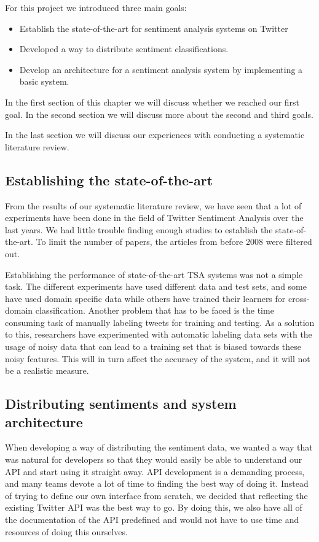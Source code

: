 
For this project we introduced three main goals:
\begin{itemize}
\item Establish the state-of-the-art for sentiment analysis systems on Twitter
\item Developed a way to distribute sentiment classifications.
\item Develop an architecture for a sentiment analysis system by implementing a basic system.
\end{itemize}

\noindent In the first section of this chapter we will discuss whether we reached our first goal. In the second section we will discuss more about the second and third goals. 

In the last section we will discuss our experiences with conducting a systematic literature review. 


\subsection{Establishing the state-of-the-art}
From the results of our systematic literature review, we have seen that a lot of experiments have been done in the field of Twitter Sentiment Analysis over the last years. We had little trouble finding enough studies to establish the state-of-the-art. To limit the number of papers, the articles from before 2008 were filtered out.

Establishing the performance of state-of-the-art TSA systems was not a simple task. The different experiments have used different data and test sets, and some have used domain specific data while others have trained their learners for cross-domain classification. Another problem that has to be faced is the time consuming task of manually labeling tweets for training and testing. As a solution to this, researchers have experimented with automatic labeling data sets with the usage of noisy data that can lead to a training set that is biased towards these noisy features. This will in turn affect the accuracy of the system, and it will not be a realistic measure. 

\subsection{Distributing sentiments and system architecture}

When developing a way of distributing the sentiment data, we wanted a way that was natural for developers so that they would easily be able to understand our API and start using it straight away. API development is a demanding process, and many teams devote a lot of time to finding the best way of doing it. Instead of trying to define our own interface from scratch, we decided that reflecting the existing Twitter API was the best way to go. By doing this, we also have all of the documentation of the API predefined and would not have to use time and resources of doing this ourselves. 


